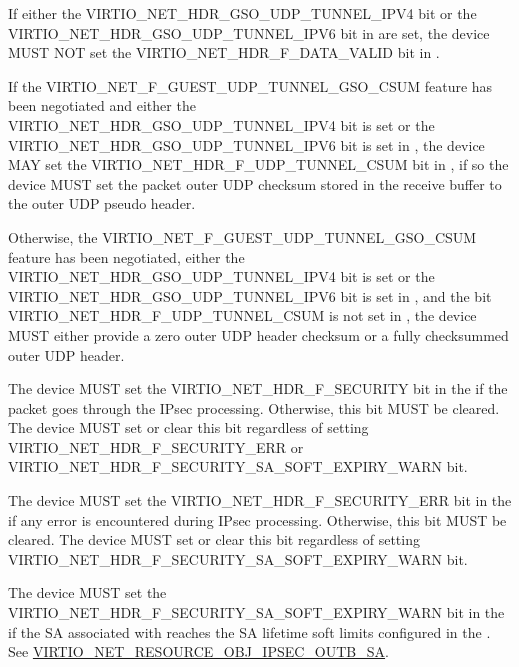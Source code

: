 If either the VIRTIO_NET_HDR_GSO_UDP_TUNNEL_IPV4 bit or the
VIRTIO_NET_HDR_GSO_UDP_TUNNEL_IPV6 bit in  are set,
the device MUST NOT set the VIRTIO_NET_HDR_F_DATA_VALID bit in
.

If the VIRTIO_NET_F_GUEST_UDP_TUNNEL_GSO_CSUM feature has been negotiated
and either the VIRTIO_NET_HDR_GSO_UDP_TUNNEL_IPV4 bit is set or the
VIRTIO_NET_HDR_GSO_UDP_TUNNEL_IPV6 bit is set in , the
device MAY set the VIRTIO_NET_HDR_F_UDP_TUNNEL_CSUM bit in
, if so the device MUST set the packet outer UDP checksum
stored in the receive buffer to the outer UDP pseudo header.

Otherwise, the VIRTIO_NET_F_GUEST_UDP_TUNNEL_GSO_CSUM feature has been
negotiated, either the VIRTIO_NET_HDR_GSO_UDP_TUNNEL_IPV4 bit is set or the
VIRTIO_NET_HDR_GSO_UDP_TUNNEL_IPV6 bit is set in ,
and the bit VIRTIO_NET_HDR_F_UDP_TUNNEL_CSUM is not set in
, the device MUST either provide a zero outer UDP header
checksum or a fully checksummed outer UDP header.

The device MUST set the VIRTIO_NET_HDR_F_SECURITY bit in the 
if the packet goes through the IPsec processing. Otherwise, this bit MUST
be cleared. The device MUST set or clear this bit regardless of setting
VIRTIO_NET_HDR_F_SECURITY_ERR or VIRTIO_NET_HDR_F_SECURITY_SA_SOFT_EXPIRY_WARN bit.

The device MUST set the VIRTIO_NET_HDR_F_SECURITY_ERR bit in the 
if any error is encountered during IPsec processing. Otherwise, this bit MUST be cleared.
The device MUST set or clear this bit regardless of setting
VIRTIO_NET_HDR_F_SECURITY_SA_SOFT_EXPIRY_WARN bit.

The device MUST set the VIRTIO_NET_HDR_F_SECURITY_SA_SOFT_EXPIRY_WARN bit in the 
if the SA associated with  reaches the SA lifetime soft limits configured in
the .
See \hyperref[par:Device Types / Crypto Device / Device Operation / IPsec Service Operation / Resource objects / VIRTIO-CRYPTO-RESOURCE-OBJ-IPSEC-OUTBOUND-SA]{VIRTIO_NET_RESOURCE_OBJ_IPSEC_OUTB_SA}.


